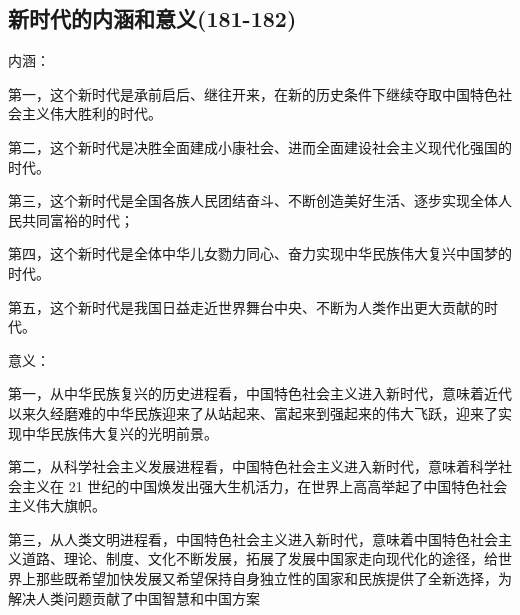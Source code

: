 \documentclass[cn,11pt]{elegantbook}
\begin{document}
\subsection{新时代的内涵和意义(181-182)}
{\large 
{\heiti 内涵：}

第一，这个新时代是承前启后、继往开来，在新的历史条件下继续夺取中国特色社会主义伟大胜利的时代。

第二，这个新时代是决胜全面建成小康社会、进而全面建设社会主义现代化强国的时代。

第三，这个新时代是全国各族人民团结奋斗、不断创造美好生活、逐步实现全体人民共同富裕的时代；

第四，这个新时代是全体中华儿女勠力同心、奋力实现中华民族伟大复兴中国梦的时代。

第五，这个新时代是我国日益走近世界舞台中央、不断为人类作出更大贡献的时代。

{\heiti 意义：}

第一，从中华民族复兴的历史进程看，中国特色社会主义进入新时代，意味着近代以来久经磨难的中华民族迎来了从站起来、富起来到强起来的伟大飞跃，迎来了实现中华民族伟大复兴的光明前景。

第二，从科学社会主义发展进程看，中国特色社会主义进入新时代，意味着科学社会主义在 21 世纪的中国焕发出强大生机活力，在世界上高高举起了中国特色社会主义伟大旗帜。

第三，从人类文明进程看，中国特色社会主义进入新时代，意味着中国特色社会主义道路、理论、制度、文化不断发展，拓展了发展中国家走向现代化的途径，给世界上那些既希望加快发展又希望保持自身独立性的国家和民族提供了全新选择，为解决人类问题贡献了中国智慧和中国方案
}
\end{document}
